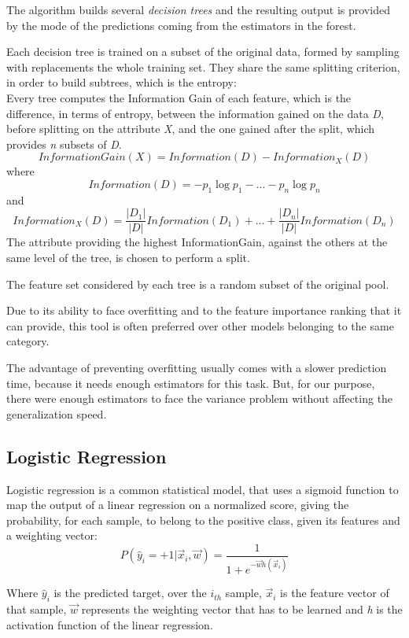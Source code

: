 The algorithm builds several \textit{decision trees} and the resulting output is provided by the mode of the predictions coming from the estimators in the forest.

Each decision tree is trained on a subset of the original data, formed by sampling with replacements the whole training set. They share the same splitting criterion, in order to build subtrees, which is the entropy:\\
Every tree computes the Information Gain of each feature, which is the difference, in terms of entropy, between the information gained on the data \textit{D}, before splitting on the attribute \textit{X}, and the one gained after the split, which provides \textit{n} subsets of \textit{D}.
\[{ \mathit{InformationGain(X)} = \mathit{Information(D)} - \mathit{Information_{X}(D)}}\]
where
\[{ \mathit{Information(D)} = - p_{1}\log p_{1} - ... - p_{n} \log p_{n}}\]
and
\[{ \mathit{Information_{X}(D)} = \frac{|D_{1}|}{|D|}Information(D_{1}) + ... + \frac{|D_{n}|}{|D|}Information(D_{n}) }\]
The attribute providing the highest InformationGain, against the others at the same level of the tree, is chosen to perform a split.

The feature set considered by each tree is a random subset of the original pool.

Due to its ability to face overfitting and to the feature importance ranking that it can provide, this tool is often preferred over other models belonging to the same category.

The advantage of preventing overfitting usually comes with a slower prediction time, because it needs enough estimators for this task.
But, for our purpose, there were enough estimators to face the variance problem without affecting the generalization speed.
\subsection{Logistic Regression}
Logistic regression is a common statistical model, that uses a sigmoid function to map the output of a linear regression on a normalized score, giving the probability, for each sample, to belong to the positive class, given its features and a weighting vector:
\[{\displaystyle P(\hat{y}_{i} = +1 | \vec{x}_{i}, \vec{w})={\frac {1}{1+e^{-\vec{w}h(\vec{x}_{i})}}}}\]

Where $ \hat{y}_{i} $ is the predicted target, over the  \textit{$i_{th}$} sample, \textit{$ \vec{x}_{i} $} is the feature vector of that sample, \textit{$ \vec{w} $} represents the weighting vector that has to be learned and \textit{h} is the activation function of the linear regression.

